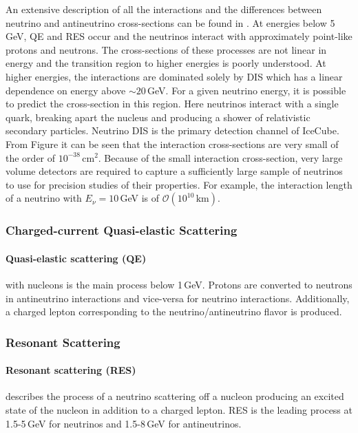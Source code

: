 An extensive description of all the interactions and the differences between neutrino and antineutrino cross-sections can be found in .
At energies below 5\,GeV, QE and RES occur and the neutrinos interact with approximately point-like protons and neutrons.
The cross-sections of these processes are not linear in energy and the transition region to higher energies is poorly understood.
At higher energies, the interactions are dominated solely by DIS which has a linear dependence on energy above $\sim20\,$GeV.
For a given neutrino energy, it is possible to predict the cross-section in this region.
Here neutrinos interact with a single quark, breaking apart the nucleus and producing a shower of relativistic secondary particles.
Neutrino DIS is the primary detection channel of IceCube.
From Figure  it can be seen that the interaction cross-sections are very small of the order of $10^{-38}\mathrm{\,cm}^2$.
Because of the small interaction cross-section, very large volume detectors are required to capture a sufficiently large sample of neutrinos to use for precision studies of their properties.
For example, the interaction length of a neutrino with $E_\nu = 10$\,GeV is of $\mathcal{O}(10^{10}\,\mathrm{km})$.


\subsubsection{Charged-current Quasi-elastic Scattering}

\paragraph{Quasi-elastic scattering (QE)} with nucleons is the main process below 1\,GeV.
Protons are converted to neutrons in antineutrino interactions and vice-versa for neutrino interactions.
Additionally, a charged lepton corresponding to the neutrino/antineutrino flavor is produced.


\subsubsection{Resonant Scattering}

\paragraph{Resonant scattering (RES)} describes the process of a neutrino scattering off a nucleon producing an excited state of the nucleon in addition to a charged lepton.
RES is the leading process at 1.5-5\,GeV for neutrinos and 1.5-8\,GeV for antineutrinos.


